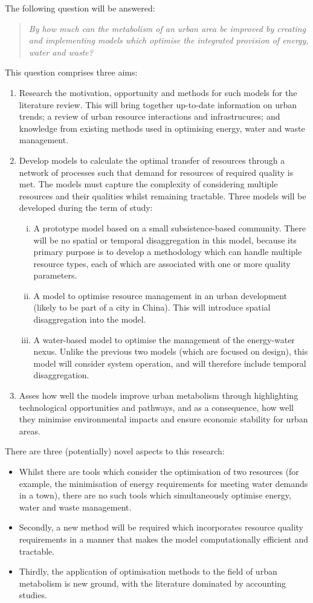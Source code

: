 The following question will be answered:
\begin{quote}
	\emph{By how much can the metabolism of an urban area be improved by creating and implementing models which optimise the integrated provision of energy, water and waste?}
\end{quote}
This question comprises three aims:
\begin{enumerate}
	\item Research the motivation, opportunity and methods for such models for the literature review. This will bring together up-to-date information on urban trends; a review of urban resource interactions and infrastrucures; and knowledge from existing methods used in optimising energy, water and waste management.
	\item Develop models to calculate the optimal transfer of resources through a network of processes such that demand for resources of required quality is met. The models must capture the complexity of considering multiple resources and their qualities whilst remaining tractable. Three models will be developed during the term of study:
		\begin{enumerate}[(i)]
			\item A prototype model based on a small subsistence-based community. There will be no spatial or temporal disaggregation in this model, because its primary purpose is to develop a methodology which can handle multiple resource types, each of which are associated with one or more quality parameters.
			\item A model to optimise resource management in an urban development (likely to be part of a city in China). This will introduce spatial disaggregation into the model.
			\item A water-based model to optimise the management of the energy-water nexus. Unlike the previous two models (which are focused on design), this model will consider system operation, and will therefore include temporal disaggregation.
		\end{enumerate}
	\item Asses how well the models improve urban metabolism through highlighting technological opportunities and pathways, and as a consequence, how well they minimise environmental impacts and ensure economic stability for urban areas.
\end{enumerate}

There are three (potentially) novel aspects to this research: 
\begin{itemize}
	\item Whilst there are tools which consider the optimisation of two resources (for example, the minimisation of energy requirements for meeting water demands in a town), there are no such tools which simultaneously optimise energy, water and waste management. 
	\item Secondly, a new method will be required which incorporates resource quality requirements in a manner that makes the model computationally efficient and tractable. 
	\item Thirdly, the application of optimisation methods to the field of urban metabolism is new ground, with the literature dominated by accounting studies.
\end{itemize}

